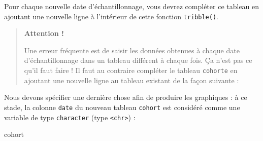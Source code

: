 \documentclass[
  french,
  a4paper,
  DIV=11,
  numbers=noendperiod,
  oneside]{scrreprt}
\newenvironment{Shaded}{}{}
\newcommand{\DecValTok}[1]{\textcolor[rgb]{0.00,0.36,0.77}{#1}}
\newcommand{\FunctionTok}[1]{\textcolor[rgb]{0.44,0.26,0.76}{#1}}
\newcommand{\NormalTok}[1]{\textcolor[rgb]{0.14,0.16,0.18}{#1}}
\newcommand{\OtherTok}[1]{\textcolor[rgb]{0.44,0.26,0.76}{#1}}
\newcommand{\SpecialCharTok}[1]{\textcolor[rgb]{0.00,0.36,0.77}{#1}}
\newcommand{\StringTok}[1]{\textcolor[rgb]{0.01,0.18,0.38}{#1}}
\begin{document}
\begin{tcolorbox}
\begin{figure}
\end{figure}%


Pour chaque nouvelle date d'échantillonnage, vous devrez compléter ce
tableau en ajoutant une nouvelle ligne à l'intérieur de cette fonction
\texttt{tribble()}.

\begin{quote}
\textbf{Attention !}

Une erreur fréquente est de saisir les données obtenues à chaque date
d'échantillonnage dans un tableau différent à chaque fois. Ça n'est pas
ce qu'il faut faire ! Il faut au contraire compléter le tableau
\texttt{cohorte} en ajoutant une nouvelle ligne au tableau existant de
la façon suivante :

\begin{Shaded}
\end{Shaded}
\end{quote}

Nous devons spécifier une dernière chose afin de produire les graphiques
: à ce stade, la colonne \texttt{date} du nouveau tableau
\texttt{cohort} est considéré comme une variable de type
\texttt{character} (type \texttt{\textless{}chr\textgreater{}}) :

\begin{Shaded}
\begin{Highlighting}[]
\NormalTok{cohort}
\end{Highlighting}
\end{Shaded}


\end{tcolorbox}
\end{document}

